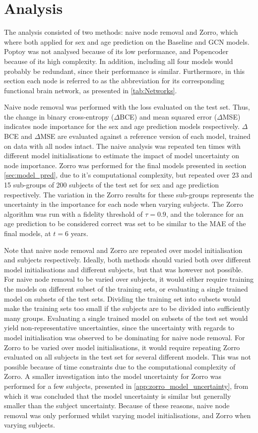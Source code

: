 \section{Analysis}
The analysis consisted of two methods: naive node removal and Zorro, which where both applied for sex and age prediction on the Baseline and GCN models. Poptoy was not analysed because of its low performance, and Popencoder because of its high complexity. In addition, including all four models would probably be redundant, since their performance is similar. Furthermore, in this section each node is referred to as the abbreviation for its corresponding functional brain network, as presented in \cref{tab:Networks}.

Naive node removal was performed with the loss evaluated on the test set. Thus, the change in binary cross-entropy ($\Delta$BCE) and mean squared error ($\Delta$MSE) indicates node importance for the sex and age prediction models respectively. $\Delta$BCE and $\Delta$MSE are evaluated against a reference version of each model, trained on data with all nodes intact. The naive analysis was repeated ten times with different model initialisations to estimate the impact of model uncertainty on node importance. Zorro was performed for the final models presented in section \ref{sec:model_pred}, due to it's computational complexity, but repeated over 23 and 15 sub-groups of 200 subjects of the test set for sex and age prediction respectively. The variation in the Zorro results for these sub-groups represents the uncertainty in the importance for each node when varying subjects. The Zorro algorithm was run with a fidelity threshold of $\tau=0.9$, and the tolerance for an age prediction to be considered correct was set to be similar to the MAE of the final models, at $t=6$ years. 

Note that naive node removal and Zorro are repeated over model initialisation and subjects respectively. Ideally, both methods should varied both over different model initialisations and different subjects, but that was however not possible. For naive node removal to be varied over subjects, it would either require training the models on different subset of the training sets, or evaluating a single trained model on subsets of the test sets. Dividing the training set into subsets would make the training sets too small if the subjects are to be divided into sufficiently many groups. Evaluating a single trained model on subsets of the test set would yield non-representative uncertainties, since the uncertainty with regards to model initialisation was observed to be dominating for naive node removal. For Zorro to be varied over model initialisations, it would require repeating Zorro evaluated on all subjects in the test set for several different models. This was not possible because of time constraints due to the computational complexity of Zorro. A smaller investigation into the model uncertainty for Zorro was performed for a few subjects, presented in \cref{app:zorro_model_uncertainty}, from which it was concluded that the model uncertainty is similar but generally smaller than the subject uncertainty. Because of these reasons, naive node removal was only performed whilst varying model initialisations, and Zorro when varying subjects. 


